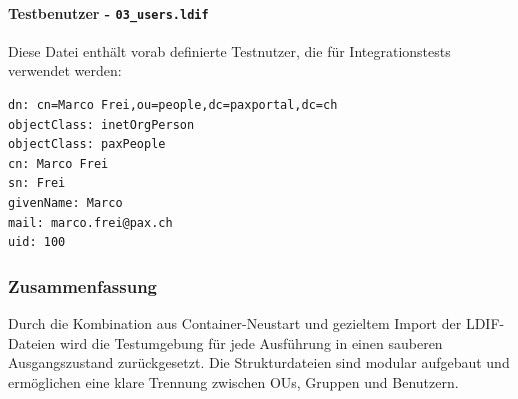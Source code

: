 \paragraph{Testbenutzer - \texttt{03\_users.ldif}}

Diese Datei enthält vorab definierte Testnutzer, die für Integrationstests verwendet werden:

\begin{lstlisting}[language=bash, caption={Auszug aus \texttt{03\_users.ldif}}]
dn: cn=Marco Frei,ou=people,dc=paxportal,dc=ch
objectClass: inetOrgPerson
objectClass: paxPeople
cn: Marco Frei
sn: Frei
givenName: Marco
mail: marco.frei@pax.ch
uid: 100
\end{lstlisting}

\subsubsection*{Zusammenfassung}

Durch die Kombination aus Container-Neustart und gezieltem Import der LDIF-Dateien wird die Testumgebung für jede Ausführung in einen sauberen Ausgangszustand zurückgesetzt. Die Strukturdateien sind modular aufgebaut und ermöglichen eine klare Trennung zwischen OUs, Gruppen und Benutzern.
